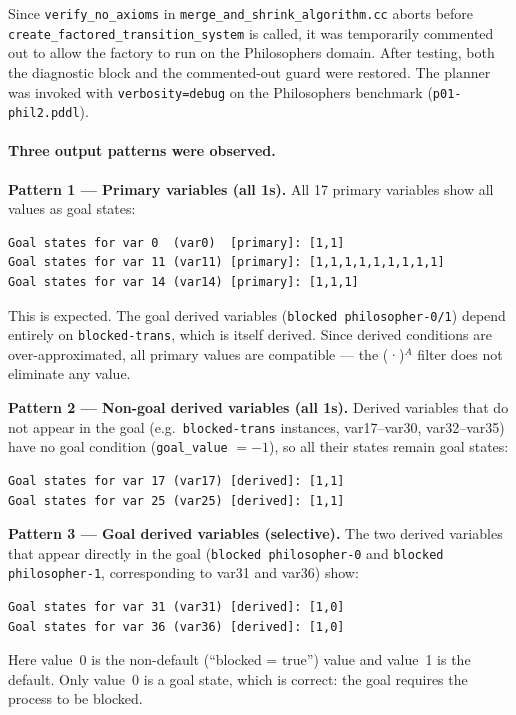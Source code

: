 \documentclass[11pt,a4paper]{article}
\begin{document}
Since \texttt{verify\_no\_axioms} in \texttt{merge\_and\_shrink\_algorithm.cc}
aborts before \texttt{create\_factored\_transition\_system} is called, it was
temporarily commented out to allow the factory to run on the Philosophers
domain.  After testing, both the diagnostic block and the commented-out guard
were restored.  The planner was invoked with \texttt{verbosity=debug} on the
Philosophers benchmark (\texttt{p01-phil2.pddl}).

\paragraph{Three output patterns were observed.}

\textbf{Pattern 1 — Primary variables (all 1s).}
All 17 primary variables show all values as goal states:
\begin{lstlisting}
Goal states for var 0  (var0)  [primary]: [1,1]
Goal states for var 11 (var11) [primary]: [1,1,1,1,1,1,1,1,1]
Goal states for var 14 (var14) [primary]: [1,1,1]
\end{lstlisting}
This is expected.  The goal derived variables (\texttt{blocked
philosopher-0/1}) depend entirely on \texttt{blocked-trans}, which is itself
derived.  Since derived conditions are over-approximated, all primary values
are compatible --- the (·)$^A$ filter does not eliminate any value.

\textbf{Pattern 2 — Non-goal derived variables (all 1s).}
Derived variables that do not appear in the goal (e.g.\ \texttt{blocked-trans}
instances, var17--var30, var32--var35) have no goal condition
(\texttt{goal\_value} $= -1$), so all their states remain goal states:
\begin{lstlisting}
Goal states for var 17 (var17) [derived]: [1,1]
Goal states for var 25 (var25) [derived]: [1,1]
\end{lstlisting}

\textbf{Pattern 3 — Goal derived variables (selective).}
The two derived variables that appear directly in the goal
(\texttt{blocked philosopher-0} and \texttt{blocked philosopher-1},
corresponding to var31 and var36) show:
\begin{lstlisting}
Goal states for var 31 (var31) [derived]: [1,0]
Goal states for var 36 (var36) [derived]: [1,0]
\end{lstlisting}
Here value~0 is the non-default (``blocked = true'') value and value~1 is
the default.  Only value~0 is a goal state, which is correct: the goal
requires the process to be blocked.
\end{document}
